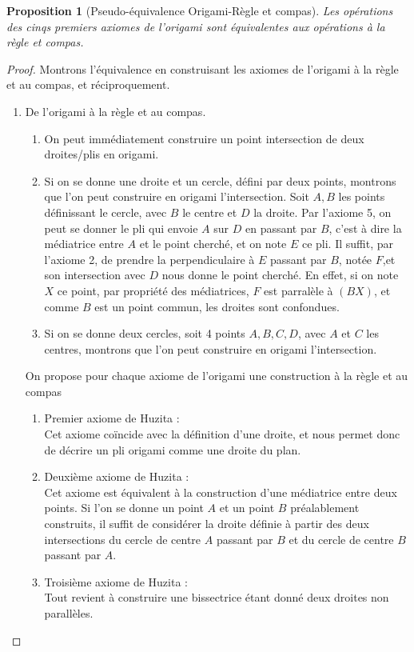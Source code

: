 \documentclass[a4paper,12pt,french]{report}
\newtheorem{proposition}{Proposition}[section]
\begin{document}
			\begin{proposition}[Pseudo-équivalence Origami-Règle et compas]
			Les opérations des cinqs premiers axiomes de l'origami sont équivalentes aux opérations à la règle et compas.
			\end{proposition}
			\begin{proof}
			Montrons l'équivalence en construisant les axiomes de l'origami à la règle et au compas, et réciproquement.
			\begin{enumerate}
				\item De l'origami à la règle et au compas.
				\begin{enumerate}
					\item On peut immédiatement construire un point intersection de deux droites\slash plis en origami.
					\item Si on se donne une droite et un cercle, défini par deux points, montrons que l'on peut construire en origami l'intersection.
					Soit $A,B$ les points définissant le cercle, avec $B$ le centre et $D$ la droite. Par l'axiome 5, on peut se donner le pli qui envoie $A$ sur $D$ en passant par $B$, c'est à dire la médiatrice entre $A$ et le point cherché, et on note $E$ ce pli. Il suffit, par l'axiome 2, de prendre la perpendiculaire à $E$ passant par $B$, notée $F$,et son intersection avec $D$ nous donne le point cherché. En effet, si on note $X$ ce point, par propriété des médiatrices, $F$ est parralèle à $(BX)$, et comme $B$ est un point commun, les droites sont confondues.
					\item Si on se donne deux cercles, soit 4 points $A,B,C,D$, avec $A$ et $C$ les centres, montrons que l'on peut construire en origami l'intersection.
				\end{enumerate}
				
				On propose pour chaque axiome de l'origami une construction à la règle et au compas
			\begin{enumerate}
				\item{Premier axiome de Huzita :} \\
					Cet axiome coïncide avec la définition d'une droite, et nous permet donc de décrire un pli origami comme une droite du plan.
				\item{Deuxième axiome de Huzita :}\\
					Cet axiome est équivalent à la construction d'une médiatrice entre deux points. Si l'on se donne un point $A$ et un point $B$ préalablement construits, il suffit de considérer la droite définie à partir des deux intersections du cercle de centre $A$ passant par $B$ et du cercle de centre $B$ passant par $A$.
				\item{Troisième axiome de Huzita :}\\
					Tout revient à construire une bissectrice étant donné deux droites non parallèles.
					

\end{enumerate}
\end{enumerate}
\end{proof}
\end{document}
